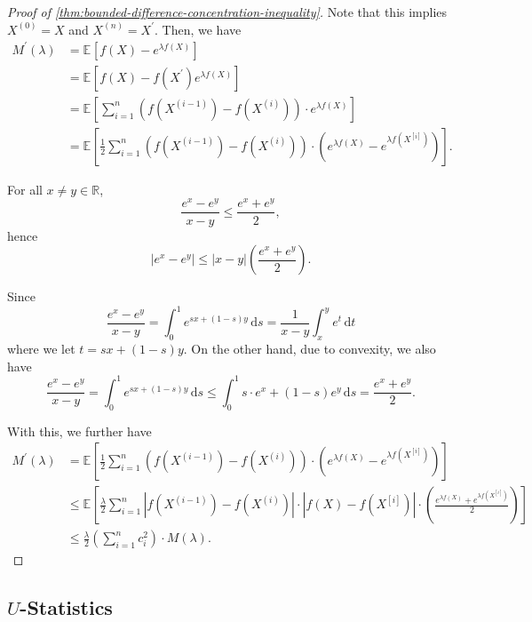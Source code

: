\begin{proof}[Proof of \autoref{thm:bounded-difference-concentration-inequality}]
	Note that this implies \(X^{(0)} = X\) and \(X^{(n)} = X^{\prime} \). Then, we have
	\[
		\begin{split}
			M^{\prime} (\lambda )
			&= \mathbb{E}_{}\left[f(X) - e^{\lambda f(X)} \right] \\
			&= \mathbb{E}_{}\left[f(X) - f(X^{\prime} ) e^{\lambda f(X)}\right] \\
			&= \mathbb{E}_{}\left[ \sum_{i=1}^{n} (f(X^{(i-1)}) - f(X^{(i)})) \cdot e^{\lambda f(X)}\right]\\
			&= \mathbb{E}_{}\left[\frac{1}{2} \sum_{i=1}^{n} \left( f(X^{(i-1)}) - f(X^{(i)}) \right) \cdot \left( e^{\lambda f(X)} - e^{\lambda f(X^{[i]})} \right)  \right].
		\end{split}
	\]
	\begin{claim}
		For all \(x \neq y \in \mathbb{R} \),
		\[
			\frac{e^x - e^y}{x-y} \leq \frac{e^x + e^y}{2},
		\]
		hence
		\[
			\vert e^x - e^y \vert \leq \vert x - y \vert \left( \frac{e^x + e^y}{2} \right) .
		\]
	\end{claim}
	\begin{explanation}
		Since
		\[
			\frac{e^x - e^y}{x-y}
			= \int_{0}^{1} e^{s x + (1 - s)y} \,\mathrm{d}s
			= \frac{1}{x - y} \int_{x}^{y} e^t \,\mathrm{d}t
		\]
		where we let \(t = sx + (1 - s)y\). On the other hand, due to convexity, we also have
		\[
			\frac{e^x - e^y}{x-y}
			= \int_{0}^{1} e^{s x + (1 - s)y} \,\mathrm{d}s
			\leq \int_{0}^{1} s\cdot e^x + (1 - s)e^y \,\mathrm{d}s
			= \frac{e^x + e^y}{2}.
		\]
	\end{explanation}

	With this, we further have
	\[
		\begin{split}
			M^{\prime} (\lambda )
			&= \mathbb{E}_{}\left[\frac{1}{2} \sum_{i=1}^{n} \left( f(X^{(i-1)}) - f(X^{(i)}) \right) \cdot \left( e^{\lambda f(X)} - e^{\lambda f(X^{[i]})} \right)  \right] \\
			&\leq \mathbb{E}_{}\left[\frac{\lambda }{2} \sum_{i=1}^{n} \left\vert f(X^{(i-1)}) - f(X^{(i)}) \right\vert \cdot \left\vert f(X) - f(X^{[i]}) \right\vert \cdot \left( \frac{e^{\lambda f(X)} + e^{\lambda f(X^{[i]})}}{2} \right)  \right] \\
			&\leq \frac{\lambda}{2}\left( \sum_{i=1}^{n} c_i^2 \right) \cdot M(\lambda ).
		\end{split}
	\]
\end{proof}

\subsection{\(U\)-Statistics}

